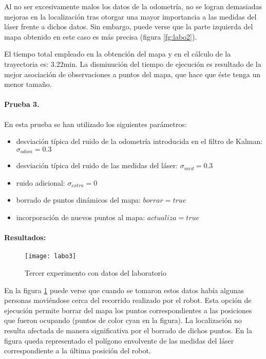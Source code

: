 Al no ser excesivamente malos los datos de la odometría, no se logran demasiadas mejoras en la localización tras otorgar una mayor importancia a las medidas del láser frente a dichos datos. Sin embargo, puede verse que la parte izquierda del mapa obtenido en este caso es más precisa (figura \ref{fg:labo2}).

El tiempo total empleado en la obtención del mapa y en el cálculo de la trayectoria es: 3.22min. La disminución del tiempo de ejecución es resultado de la mejor asociación de observaciones a puntos del mapa, que hace que éste tenga un menor tamaño.

\paragraph{Prueba 3.}
En esta prueba se han utilizado los siguientes parámetros:
\begin{itemize}
  \item desviación típica del ruido de la odometría introducida en el filtro de Kalman: $\sigma_{odom} = 0.3$
  \item desviación típica del ruido de las medidas del láser: $\sigma_{med} = 0.3$
  \item ruido adicional: $\sigma_{extra} = 0$
  \item borrado de puntos dinámicos del mapa: $borrar = true$
  \item incorporación de nuevos puntos al mapa: $actualiza = true$
\end{itemize}


\paragraph{Resultados:}

\begin{figure}[h]
  \centering\texttt{[image: labo3]}\\
  \caption{Tercer experimento con datos del laboratorio}\label{fg:labo3}
\end{figure}

En la figura \ref{fg:labo3} puede verse que cuando se tomaron estos datos había algunas personas moviéndose cerca del recorrido realizado por el robot. Esta opción de ejecución permite borrar del mapa los puntos correspondientes a las posiciones que fueron ocupando (puntos de color cyan en la figura). La localización no resulta afectada de manera significativa por el borrado de dichos puntos. En la figura queda representado el polígono envolvente de las medidas del láser correspondiente a la última posición del robot.

